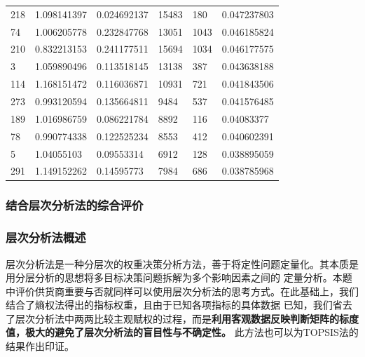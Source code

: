 \documentclass{cumcmthesis}
\begin{document}
\begin{longtable}{l|llll|l}
    218  & 1.098141397  & 0.024692137  & 15483    & 180            & 0.047237803    \\
    74   & 1.006205778  & 0.232847768  & 13051    & 1043           & 0.046185824    \\
    210  & 0.832213153  & 0.241177511  & 15694    & 1034           & 0.046177575    \\
    3    & 1.059890496  & 0.113518145  & 13138    & 387            & 0.043638188    \\
    114  & 1.168151472  & 0.116036871  & 10931    & 721            & 0.041843506    \\
    273  & 0.993120594  & 0.135664811  & 9484     & 537            & 0.041576485    \\
    189  & 1.016986759  & 0.086221784  & 8892     & 116            & 0.04083377     \\
    78   & 0.990774338  & 0.122525234  & 8553     & 412            & 0.040602391    \\
    5    & 1.04055103   & 0.09553314   & 6912     & 128            & 0.038895059    \\
    291  & 1.149152262  & 0.14595773   & 7984     & 686            & 0.038785968    \\
    \bottomrule
\end{longtable}

\subsubsection{结合层次分析法的综合评价}

\subsubsection*{层次分析法概述}
层次分析法是一种分层次的权重决策分析方法，善于将定性问题定量化。其本质是用分层分析的思想将多目标决策问题拆解为多个影响因素之间的
定量分析。本题中评价供货商重要与否就同样可以使用层次分析法的思考方式。在此基础上，我们结合了熵权法得出的指标权重，且由于已知各项指标的具体数据
已知，我们省去了层次分析法中两两比较主观赋权的过程，而是\textbf{利用客观数据反映判断矩阵的标度值，极大的避免了层次分析法的盲目性与不确定性。}
此方法也可以为TOPSIS法的结果作出印证。
\end{document}
